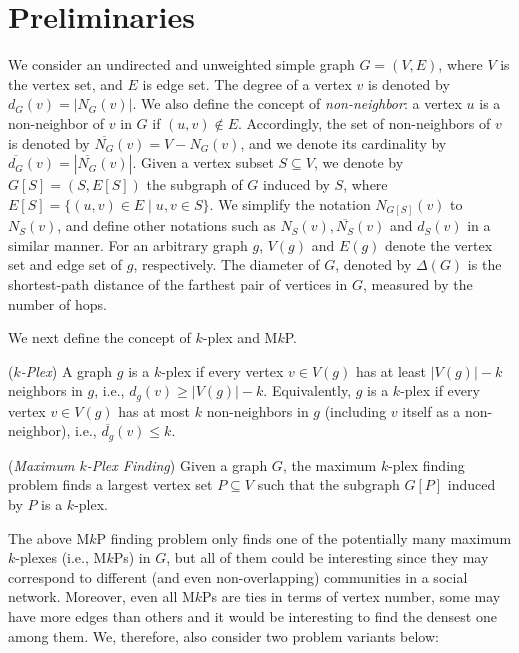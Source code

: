\documentclass[sigconf, nonacm]{acmart}
\begin{document}
\section{Preliminaries}\label{sec:pre}
We consider an undirected and unweighted simple graph $G=(V, E)$, where $V$ is the vertex set, and $E$ is edge set. The degree of a vertex $v$ is denoted by $d_G(v)=|N_G(v)|$. 
We also define the concept of {\em non-neighbor}: a vertex $u$ is a non-neighbor of $v$ in $G$ if $(u, v)\not\in E$. Accordingly, the set of non-neighbors of $v$ is denoted by $\overline{N_G}(v)=V- N_G(v)$, and we denote its cardinality by $\overline{d_G}(v)=|\overline{N_G}(v)|$.
Given a vertex subset $S\subseteq V$, we denote by $G[S]=(S, E[S])$ the subgraph of $G$ induced by $S$, where $E[S]=\{(u,v)\in E\mid u,v\in S\}$. We simplify the notation $N_{G[S]}(v)$ to $N_S(v)$, and define other notations such as $N_S(v), \overline{N_S}(v)$ and $d_S(v)$ in a similar manner. For an arbitrary graph $g$, $V(g)$ and $E(g)$ denote the vertex set and edge set of $g$, respectively. 
The diameter of $G$, denoted by $\Delta(G)$ is the shortest-path distance of the farthest pair of vertices in $G$, measured by the number of hops.

\vspace{1mm}
 We next define the concept of $k$-plex and M$k$P.

\vspace{-1mm}
\begin{definition}(\emph{$k$-Plex})\label{def:kplex}
    A graph $g$ is a $k$-plex if every vertex $v\in V(g)$ has at least $|V(g)|-k$ neighbors in $g$, i.e., $d_g(v)\ge |V(g)|-k$. Equivalently, $g$ is a $k$-plex if every vertex $v\in V(g)$ has at most $k$ non-neighbors in $g$ (including $v$ itself as a non-neighbor), i.e., $\overline{d_g}(v)\le k$.
\end{definition}

\vspace{-2mm}
\begin{definition}(\emph{Maximum $k$-Plex Finding})\label{def:MkP}
  Given a graph $G$, the maximum $k$-plex finding problem finds a largest vertex set $P\subseteq V$ such that the subgraph $G[P]$ induced by $P$ is a $k$-plex. 
\end{definition}
\vspace{-1mm}

The above M$k$P finding problem only finds one of the potentially many maximum $k$-plexes (i.e., M$k$Ps) in $G$, but all of them could be interesting since they may correspond to different (and even non-overlapping) communities in a social network. Moreover, even all M$k$Ps are ties in terms of vertex number, some may have more edges than others and it would be interesting to find the densest one among them. We, therefore, also consider two problem variants below:
\end{document}
